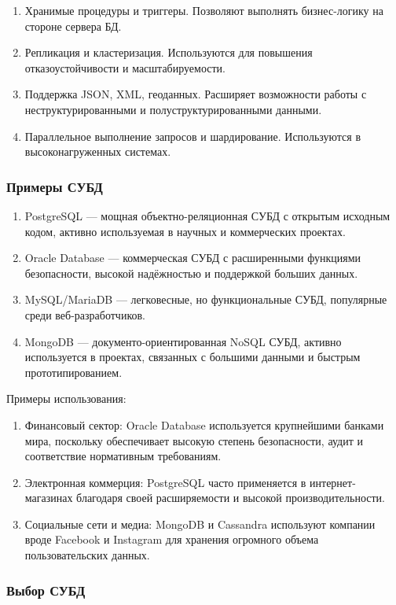\begin{enumerate}
	\item Хранимые процедуры и триггеры. Позволяют выполнять бизнес-логику на стороне сервера БД.
	\item Репликация и кластеризация. Используются для повышения отказоустойчивости и масштабируемости.
	\item Поддержка JSON, XML, геоданных. Расширяет возможности работы с неструктурированными и полуструктурированными данными.
	\item Параллельное выполнение запросов и шардирование. Используются в высоконагруженных системах.
\end{enumerate}

\subsubsection{Примеры СУБД}

\begin{enumerate}
	\item PostgreSQL — мощная объектно-реляционная СУБД с открытым исходным кодом, активно используемая в научных и коммерческих проектах.
	\item Oracle Database — коммерческая СУБД с расширенными функциями безопасности, высокой надёжностью и поддержкой больших данных.
	\item MySQL/MariaDB — легковесные, но функциональные СУБД, популярные среди веб-разработчиков.
	\item MongoDB — документо-ориентированная NoSQL СУБД, активно используется в проектах, связанных с большими данными и быстрым прототипированием.
\end{enumerate}

Примеры использования:
\begin{enumerate}
	\item Финансовый сектор: Oracle Database используется крупнейшими банками мира, поскольку обеспечивает высокую степень безопасности, аудит и соответствие нормативным требованиям.
	\item Электронная коммерция: PostgreSQL часто применяется в интернет-магазинах благодаря своей расширяемости и высокой производительности.
	\item Социальные сети и медиа: MongoDB и Cassandra используют компании вроде Facebook и Instagram для хранения огромного объема пользовательских данных.
\end{enumerate}

\subsubsection{Выбор СУБД}


